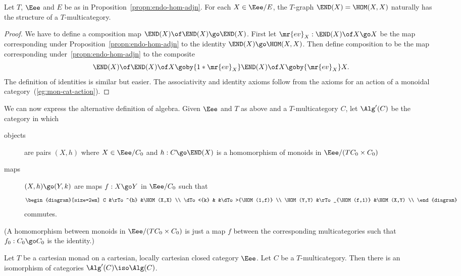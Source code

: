 \begin{propn}
Let $T$, $\Eee$ and $E$ be as in Proposition~\ref{propn:endo-hom-adjn}.
For each $X \in \Eee/E$, the $T$-graph $\END(X) = \HOM(X,X)$ naturally has
the structure of a $T$-multicategory.
\end{propn}

\begin{proof}
We have to define a composition map $\END(X) \of \END(X) \go \END(X)$.
First let $\mr{ev}_X: \END(X) \of X \go X$ be the map corresponding under
Proposition~\ref{propn:endo-hom-adjn} to the identity $\END(X) \go
\HOM(X,X)$.  Then define composition to be the map corresponding
under~\ref{propn:endo-hom-adjn} to the composite
\[
\END(X) \of \END(X) \of X
\goby{1 * \mr{ev}_X}
\END(X) \of X
\goby{\mr{ev}_X}
X.
\]
The definition of identities is similar but easier.  The associativity and
identity axioms follow from the axioms for an action of a monoidal
category~(\ref{eg:mon-cat-action}).  
\done
\end{proof}

We can now express the alternative definition of algebra.  Given $\Eee$ and
$T$ as above and a $T$-multicategory $C$, let $\Alg'(C)$ be the category in
which
%
\begin{description}
\item[objects] are pairs $(X, h)$ where $X \in \Eee/C_0$ and $h:
C \go \END(X)$ is a homomorphism of monoids in $\Eee/(TC_0 \times C_0)$
\item[maps] $(X, h) \go (Y, k)$ are maps $f: X \go Y$ in
$\Eee/C_0$ such that 
\[
\begin{diagram}[size=2em]
C		&\rTo^{h}		&\HOM(X,X)	\\
\dTo<{k}	&			&\dTo>{\HOM(1,f)}	\\
\HOM(Y,Y)       &\rTo_{\HOM(f,1)}       &\HOM(X,Y)		\\
\end{diagram}
\]
commutes.
\end{description}
%
(A homomorphism between monoids in $\Eee/(TC_0 \times C_0)$ is just a map
$f$ between the corresponding multicategories such that $f_0: C_0 \go C_0$
is the identity.)

%
\begin{thm}
Let $T$ be a cartesian monad on a cartesian, locally cartesian closed
category $\Eee$.  Let $C$ be a $T$-multicategory.  Then there is an
isomorphism of categories $\Alg'(C) \iso \Alg(C)$.
\end{thm}

